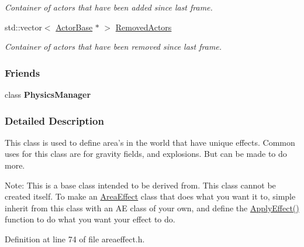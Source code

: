 \begin{DoxyCompactItemize}
\begin{DoxyCompactList}\small\item\em Container of actors that have been added since last frame. \item\end{DoxyCompactList}\item 
\hypertarget{classphys_1_1AreaEffect_a1b1b6cced61ead4d6de3d8bad5c2125a}{
std::vector$<$ \hyperlink{classphys_1_1ActorBase}{ActorBase} $\ast$ $>$ \hyperlink{classphys_1_1AreaEffect_a1b1b6cced61ead4d6de3d8bad5c2125a}{RemovedActors}}
\label{classphys_1_1AreaEffect_a1b1b6cced61ead4d6de3d8bad5c2125a}

\begin{DoxyCompactList}\small\item\em Container of actors that have been removed since last frame. \item\end{DoxyCompactList}\end{DoxyCompactItemize}
\subsubsection*{Friends}
\begin{DoxyCompactItemize}
\item 
\hypertarget{classphys_1_1AreaEffect_a139cf05ac01161b7071c8a037c841683}{
class {\bfseries PhysicsManager}}
\label{classphys_1_1AreaEffect_a139cf05ac01161b7071c8a037c841683}

\end{DoxyCompactItemize}


\subsubsection{Detailed Description}
This class is used to define area's in the world that have unique effects. Common uses for this class are for gravity fields, and explosions. But can be made to do more. \par
 Note: This is a base class intended to be derived from. This class cannot be created itself. To make an \hyperlink{classphys_1_1AreaEffect}{AreaEffect} class that does what you want it to, simple inherit from this class with an AE class of your own, and define the \hyperlink{classphys_1_1AreaEffect_a3b285ecfcf9c9200662d510e48dd222a}{ApplyEffect()} function to do what you want your effect to do. 

Definition at line 74 of file areaeffect.h.



